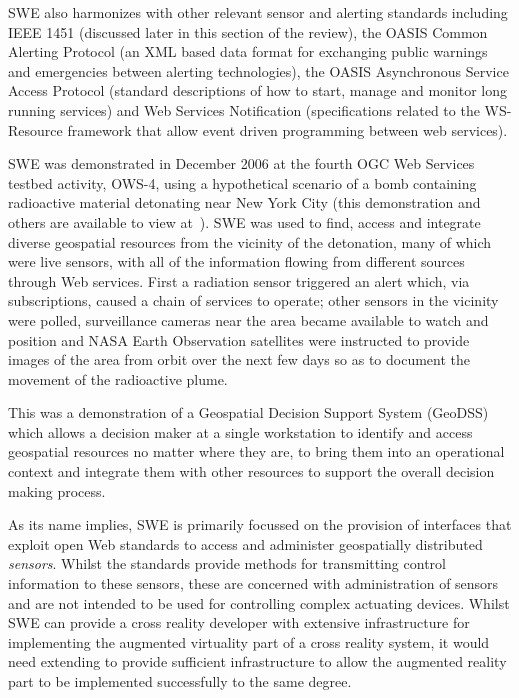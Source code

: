 SWE also harmonizes with other relevant sensor and alerting standards including IEEE 1451 (discussed later in this section of the review), the OASIS Common Alerting Protocol (an XML based data format for exchanging public warnings and emergencies between alerting technologies), the OASIS Asynchronous Service Access Protocol (standard descriptions of how to start, manage and monitor long running services) and Web Services Notification (specifications related to the WS-Resource framework that allow event driven programming between web services).

SWE was demonstrated in December 2006 at the fourth OGC Web Services testbed activity, OWS-4, using a hypothetical scenario of a bomb containing radioactive material detonating near New York City (this demonstration and others are available to view at~\cite{OpenGeospatialConsortium}). SWE was used to find, access and integrate diverse geospatial resources from the vicinity of the detonation, many of which were live sensors, with all of the information flowing from different sources through Web services. First a radiation sensor triggered an alert which, via subscriptions, caused a chain of services to operate; other sensors in the vicinity were polled, surveillance cameras near the area became available to watch and position and NASA Earth Observation satellites were instructed to provide images of the area from orbit over the next few days so as to document the movement of the radioactive plume.

This was a demonstration of a Geospatial Decision Support System (GeoDSS) which allows a decision maker at a single workstation to identify and access geospatial resources no matter where they are, to bring them into an operational context and integrate them with other resources to support the overall decision making process.

As its name implies, SWE is primarily focussed on the provision of interfaces that exploit open Web standards to access and administer geospatially distributed \textit{sensors}. Whilst the standards provide methods for transmitting control information to these sensors, these are concerned with administration of sensors and are not intended to be used for controlling complex actuating devices. Whilst SWE can provide a cross reality developer with extensive infrastructure for implementing the augmented virtuality part of a cross reality system, it would need extending to provide sufficient infrastructure to allow the augmented reality part to be implemented successfully to the same degree.

